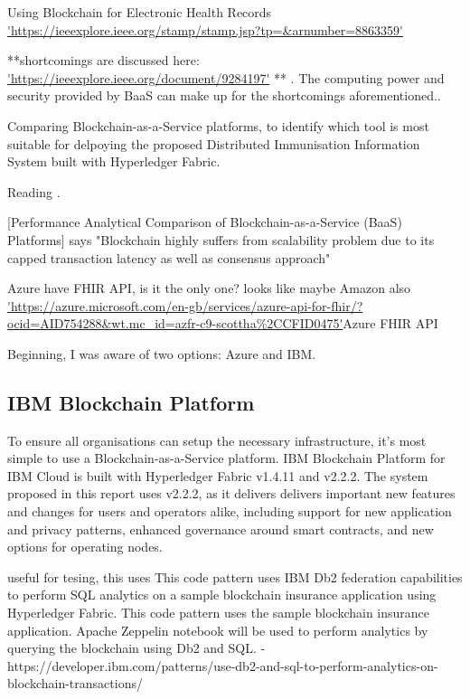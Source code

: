 Using Blockchain for Electronic Health Records \url{'https://ieeexplore.ieee.org/stamp/stamp.jsp?tp=&arnumber=8863359'} \cite{shahnaz_using_2019} 


**shortcomings are discussed here: \url{'https://ieeexplore.ieee.org/document/9284197'} \cite{brotsis_security_2020} ** . The computing power and security provided by BaaS can make up for the shortcomings aforementioned.\cite{song_research_2021}.

Comparing Blockchain-as-a-Service platforms, to identify which tool is most suitable for delpoying the proposed Distributed Immunisation Information System built with Hyperledger Fabric.\linebreak[1]

Reading \cite{onik_performance_2019}.\linebreak[1]

[Performance Analytical Comparison of Blockchain-as-a-Service (BaaS) Platforms] says "Blockchain highly suffers from scalability problem due to its capped transaction
latency as well as consensus approach"\linebreak[1]

Azure have FHIR API, is it the only one? looks like maybe Amazon also \url{'https://azure.microsoft.com/en-gb/services/azure-api-for-fhir/?ocid=AID754288&wt.mc_id=azfr-c9-scottha%2CCFID0475'}{Azure FHIR API}
\linebreak[1]

Beginning, I was aware of two options: Azure and IBM.\linebreak[1]

\subsection{IBM Blockchain Platform}
To ensure all organisations can setup the necessary infrastructure, it's most simple to use a Blockchain-as-a-Service platform. 
IBM Blockchain Platform for IBM Cloud is built with Hyperledger Fabric v1.4.11 and v2.2.2. The system proposed in this report uses v2.2.2, as it delivers delivers important new features and changes for users and operators alike, including support for new application and privacy patterns, enhanced governance around smart contracts, and new options for operating nodes. \cite{noauthor_whats_nodate}

useful for tesing, this uses This code pattern uses IBM Db2 federation capabilities to perform SQL analytics on a sample blockchain insurance application using Hyperledger Fabric. 
This code pattern uses the sample blockchain insurance application. Apache Zeppelin notebook will be used to perform analytics by querying the blockchain using Db2 and SQL. - https://developer.ibm.com/patterns/use-db2-and-sql-to-perform-analytics-on-blockchain-transactions/

